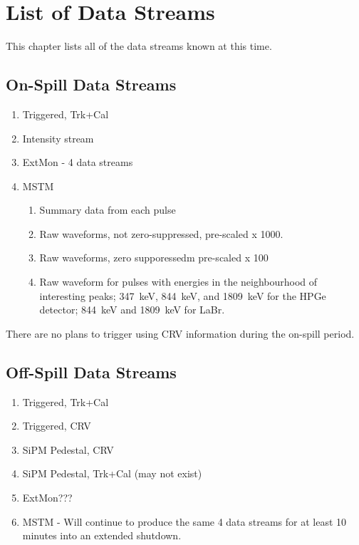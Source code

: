 \chapter{List of Data Streams}
\label{ch:data_streams}

This chapter lists all of the data streams known at this time.

\section{On-Spill Data Streams}
\label{sec:on_spill_data_streams}

\begin{enumerate}
\item Triggered, Trk+Cal
\item Intensity stream
\item ExtMon - 4 data streams
\item MSTM
  \begin{enumerate}
    \item Summary data from each pulse
    \item Raw waveforms, not zero-suppressed, pre-scaled x 1000.
    \item Raw waveforms, zero supporessedm pre-scaled x 100
    \item Raw waveform for pulses with energies in the neighbourhood of interesting peaks;
      347~keV, 844~keV, and 1809~keV for the HPGe detector; 844~keV and 1809~keV for LaBr.
  \end{enumerate}
\end{enumerate}

There are no plans to trigger using CRV information during the on-spill period.

\section{Off-Spill Data Streams}
\label{sec:off_spill_data_streams}

\begin{enumerate}
\item Triggered, Trk+Cal
\item Triggered, CRV
\item SiPM Pedestal, CRV
  \item SiPM Pedestal, Trk+Cal (may not exist)
\item ExtMon???
\item MSTM - Will continue to produce the same 4 data streams for at least 10 minutes into an extended shutdown.
\end{enumerate}

